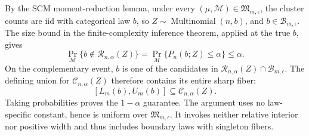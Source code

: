 By the SCM moment-reduction lemma, under every \((\mu,\mathcal M)\in\mathfrak M_{m,\epsilon}\), the cluster counts are iid with categorical law \(b\), so \(Z\sim\operatorname{Multinomial}(n,b)\), and \(b\in\mathcal B_{m,\epsilon}\).  The size bound in the finite-complexity inference theorem, applied at the true \(b\), gives
\[
 \Pr_{\mathcal M}\{b\notin\mathcal R_{n,\alpha}(Z)\}
 =\Pr_{\mathcal M}\{P_n(b;Z)\leq\alpha\}\leq\alpha.
\]
On the complementary event, \(b\) is one of the candidates in \(\mathcal R_{n,\alpha}(Z)\cap\mathcal B_{m,\epsilon}\).  The defining union for \(\mathcal C_{n,\alpha}(Z)\) therefore contains its entire sharp fiber:
\[
 [L_m(b),U_m(b)]\subseteq\mathcal C_{n,\alpha}(Z).
\]
Taking probabilities proves the \(1-\alpha\) guarantee.  The argument uses no law-specific constant, hence is uniform over \(\mathfrak M_{m,\epsilon}\).  It invokes neither relative interior nor positive width and thus includes boundary laws with singleton fibers.